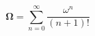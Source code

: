 \begin{equation}
\mathbf{\Omega}=\sum\limits_{n=0}^{\infty }\dfrac{\omega ^{n}}{(n+1)!}
\end{equation}

